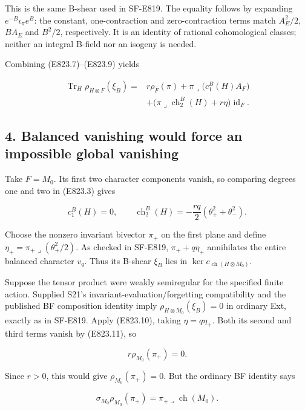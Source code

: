 This is the same B-shear used in SF-E819. The equality follows by
expanding \(e^{-B}\iota_\pi e^B\): the constant, one-contraction and
zero-contraction terms match \(A_E^2/2\), \(BA_E\) and \(B^2/2\),
respectively. It is an identity of rational cohomological classes;
neither an integral B-field nor an isogeny is needed.

Combining (E823.7)--(E823.9) yields

\[
 \begin{split}
 \operatorname{Tr}_H\rho_{H\otimes F}(\xi_B)
   ={}&r\rho_F(\pi)
     +\pi\mathbin{\lrcorner}\bigl(c_1^B(H)A_F\bigr)\\
    &+\bigl(\pi\mathbin{\lrcorner}\operatorname{ch}_2^B(H)
                         +r\eta\bigr)\operatorname{id}_F.
 \end{split}
 \tag{E823.10}
\]

\subsection{4. Balanced vanishing would force an impossible global
vanishing}\label{SF-E823-balanced-vanishing-would-force-an-impossible-global-vanishing}

Take \(F=M_0\). Its first two character components vanish, so comparing
degrees one and two in (E823.3) gives

\[
 c_1^B(H)=0,
 \qquad \operatorname{ch}_2^B(H)
       =-\frac{rq}{2}(\theta_+^2+\theta_-^2).
 \tag{E823.11}
\]

Choose the nonzero invariant bivector \(\pi_+\) on the first plane and
define \(\eta_+=\pi_+\mathbin{\lrcorner}(\theta_+^2/2)\). As checked in
SF-E819, \(\pi_++q\eta_+\) annihilates the entire balanced character
\(v_q\). Thus its B-shear \(\xi_B\) lies in
\(\ker c_{\operatorname{ch}(H\otimes M_0)}\).

Suppose the tensor product were weakly semiregular for the specified
finite action. Supplied S21's invariant-evaluation/forgetting
compatibility and the published BF composition identity imply
\(\rho_{H\otimes M_0}(\xi_B)=0\) in ordinary Ext, exactly as in SF-E819.
Apply (E823.10), taking \(\eta=q\eta_+\). Both its second and third
terms vanish by (E823.11), so

\[
 r\rho_{M_0}(\pi_+)=0.
 \tag{E823.12}
\]

Since \(r>0\), this would give \(\rho_{M_0}(\pi_+)=0\). But the ordinary
BF identity says

\[
 \sigma_{M_0}\rho_{M_0}(\pi_+)
       =\pi_+\mathbin{\lrcorner}\operatorname{ch}(M_0).
 \tag{E823.13}
\]

